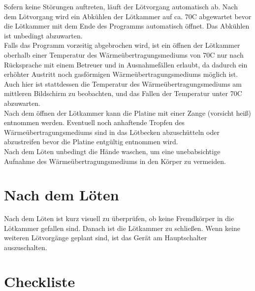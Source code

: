 \documentclass{\basedir/fablab-document}
\renewcommand{\todo}[1]{\textbf{\color{red}{TODO: #1}}}
\begin{document}

Sofern keine St{\"o}rungen auftreten, l{\"a}uft der L{\"o}tvorgang automatisch ab. Nach dem L{\"o}tvorgang wird ein Abk{\"u}hlen der L{\"o}tkammer auf ca. 70\textdegree C abgewartet bevor die L{\"o}tkammer mit dem Ende des Programms automatisch {\"o}ffnet. Das Abk{\"u}hlen ist unbedingt abzuwarten.\\

Falls das Programm vorzeitig abgebrochen wird, ist ein {\"o}ffnen der L{\"o}tkammer oberhalb einer Temperatur des W{\"a}rme{\"u}bertragungsmediums von 70\textdegree C nur nach R{\"u}cksprache mit einem Betreuer und in Ausnahmef{\"a}llen erlaubt, da dadurch ein erh{\"o}hter Austritt noch gasf{\"o}rmigen W{\"a}rme{\"u}bertragungsmediums m{\"o}glich ist. Auch hier ist stattdessen die Temperatur des W{\"a}rme{\"u}bertragungsmediums am mittleren Bildschirm zu beobachten, und das Fallen der Temperatur unter 70\textdegree C abzuwarten.\\

Nach dem {\"o}ffnen der L{\"o}tkammer kann die Platine mit einer Zange (vorsicht hei{\ss}) entnommen werden. Eventuell noch anhaftende Tropfen des W{\"a}rme{\"u}bertragungsmediums sind in das L{\"o}tbecken abzusch{\"u}tteln oder abzustreifen bevor die Platine entg{\"u}ltig entnommen wird.\\

Nach dem L{\"o}ten unbedingt die H{\"a}nde waschen, um eine unebabsichtige Aufnahme des W{\"a}rme{\"u}bertragungsmediums in den K{\"o}rper zu vermeiden.

\section{Nach dem L{\"o}ten}

Nach dem L{\"o}ten ist kurz visuell zu {\"u}berpr{\"u}fen, ob keine Fremdk{\"o}rper in die L{\"o}tkammer gefallen sind. Danach ist die L{\"o}tkammer zu schlie{\ss}en. Wenn keine weiteren L{\"o}tvorg{\"a}nge geplant sind, ist das Ger{\"a}t am Hauptschalter auszuschalten.
	\newpage
	\section{Checkliste}
\end{document}
